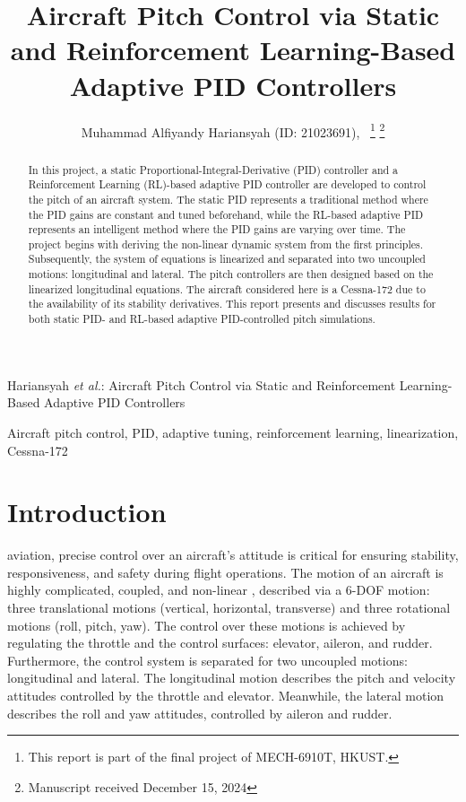 \documentclass[lettersize,journal]{IEEEtran}
\begin{document}
\title{Aircraft Pitch Control via Static and Reinforcement Learning-Based Adaptive PID Controllers}

\author{Muhammad Alfiyandy Hariansyah (ID: 21023691),~%
\thanks{This report is part of the final project of MECH-6910T, HKUST.}%
\thanks{Manuscript received December 15, 2024}}

%
{Hariansyah \MakeLowercase{\textit{et al.}}: Aircraft Pitch Control via Static and Reinforcement Learning-Based Adaptive PID Controllers}

\maketitle

\begin{abstract}
In this project, a static Proportional-Integral-Derivative (PID) controller and a Reinforcement Learning (RL)-based adaptive PID controller are developed to control the pitch of an aircraft system. The static PID represents a traditional method where the PID gains are constant and tuned beforehand, while the RL-based adaptive PID represents an intelligent method where the PID gains are varying over time. The project begins with deriving the non-linear dynamic system from the first principles. Subsequently, the system of equations is linearized and separated into two uncoupled motions: longitudinal and lateral. The pitch controllers are then designed based on the linearized longitudinal equations. The aircraft considered here is a Cessna-172 due to the availability of its stability derivatives. This report presents and discusses results for both static PID- and RL-based adaptive PID-controlled pitch simulations.
\end{abstract}

\begin{IEEEkeywords}
Aircraft pitch control, PID, adaptive tuning, reinforcement learning, linearization, Cessna-172
\end{IEEEkeywords}

\section{Introduction}

 aviation, precise control over an aircraft’s attitude is critical for ensuring stability, responsiveness, and safety during flight operations. The motion of an aircraft is highly complicated, coupled, and non-linear \cite{ref1}, described via a 6-DOF motion: three translational motions (vertical, horizontal, transverse) and three rotational motions (roll, pitch, yaw). The control over these motions is achieved by regulating the throttle and the control surfaces: elevator, aileron, and rudder. Furthermore, the control system is separated for two uncoupled motions: longitudinal and lateral. The longitudinal motion describes the pitch and velocity attitudes controlled by the throttle and elevator. Meanwhile, the lateral motion describes the roll and yaw attitudes, controlled by aileron and rudder.
\end{document}
